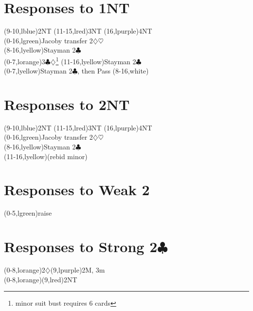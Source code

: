 \documentclass{article}
\def\C{$\clubsuit$}
\def\D{$\diamondsuit$}
\def\H{$\heartsuit$}
\def\S{$\spadesuit$}
\begin{document}
\section{Responses to 1NT}
\begin{ptable}
  \bid(9-10,lblue){2NT}
  \bid(11-15,lred){3NT}
  \bid(16,lpurple){4NT}\\
  \bid(0-16,lgreen){Jacoby transfer 2\D\H}\\
  \bid(8-16,lyellow){Stayman 2\C}\\
  \bid(0-7,lorange){3\C\D\footnote{minor suit bust requires 6 cards}}
  \bid*(11-16,lyellow){Stayman 2\C}\\
\row{444 in \D\H\S}
  \bid(0-7,lyellow){Stayman 2\C, then Pass}
  \bid(8-16,white){\ditto{1.7in}}\\
\end{ptable}

\section{Responses to 2NT}
\begin{ptable}
  \bid(9-10,lblue){2NT}
  \bid(11-15,lred){3NT}
  \bid(16,lpurple){4NT}\\
  \bid(0-16,lgreen){Jacoby transfer 2\D\H}\\
  \bid(8-16,lyellow){Stayman 2\C}\\
  \bid(11-16,lyellow){(rebid minor)}\\
\end{ptable}

\section{Responses to Weak 2}
\begin{ptable}
\bid(0-5,lgreen){raise}\\
\end{ptable}

\section{Responses to Strong 2\C}
\begin{ptable}
\bid*(0-8,lorange){2\D}\bid(9,lpurple){2M, 3m}\\
\bid(0-8,lorange){\cdrop[-.45pc]{2\D}}\bid(9,lred){2NT}\\
\end{ptable}
\end{document}
